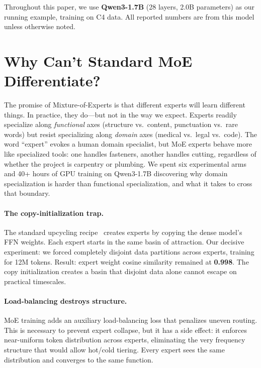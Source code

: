 \documentclass{article}
\begin{document}
Throughout this paper, we use \textbf{Qwen3-1.7B} (28 layers, 2.0B parameters)
as our running example, training on C4 data. All reported numbers are from this
model unless otherwise noted.

\section{Why Can't Standard MoE Differentiate?}
\label{sec:why-moe-fails}

The promise of Mixture-of-Experts is that different experts will learn different
things. In practice, they do---but not in the way we expect. Experts readily
specialize along \emph{functional} axes (structure vs.\ content, punctuation
vs.\ rare words) but resist specializing along \emph{domain} axes (medical
vs.\ legal vs.\ code). The word ``expert'' evokes a human domain specialist,
but MoE experts behave more like specialized tools: one handles
fasteners, another handles cutting, regardless of whether the project is
carpentry or plumbing. We spent six experimental arms and 40+ hours of GPU
training on Qwen3-1.7B discovering why domain specialization is harder than
functional specialization, and what it takes to cross that boundary.

\paragraph{The copy-initialization trap.}
The standard upcycling recipe~\cite{komatsuzaki2023sparse} creates experts by
copying the dense model's FFN weights. Each expert starts in the same basin of
attraction. Our decisive experiment: we forced completely disjoint data
partitions across experts, training for 12M tokens. Result: expert weight cosine
similarity remained at \textbf{0.998}. The copy initialization creates a basin
that disjoint data alone cannot escape on practical timescales.

\paragraph{Load-balancing destroys structure.}
MoE training adds an auxiliary load-balancing loss that penalizes uneven routing.
This is necessary to prevent expert collapse, but it has a side effect: it
enforces near-uniform token distribution across experts, eliminating the very
frequency structure that would allow hot/cold tiering. Every expert sees the
same distribution and converges to the same function.
\end{document}
